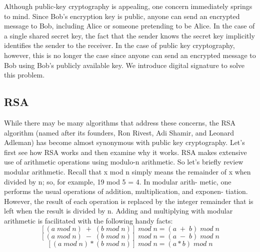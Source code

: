 \documentclass{report}
\theoremstyle{definition}
\begin{document}
{{\Large{Although public-key cryptography is appealing, one concern immediately
springs to mind. Since Bob’s encryption key is public, anyone can send an encrypted message to Bob, including Alice or someone pretending to be Alice. In the case of
a single shared secret key, the fact that the sender knows the secret key implicitly
identifies the sender to the receiver. In the case of public key cryptography, however,
this is no longer the case since anyone can send an encrypted message to Bob using
Bob’s publicly available key. We introduce digital signature to solve this problem.
\subsection{RSA}
\Large{While there may be many algorithms that address these concerns, the RSA algorithm
(named after its founders, Ron Rivest, Adi Shamir, and Leonard Adleman) has
become almost synonymous with public key cryptography. Let’s first see how RSA
works and then examine why it works.
RSA makes extensive use of arithmetic operations using modulo-n arithmetic.
So let’s briefly review modular arithmetic. Recall that x mod n simply means the
remainder of x when divided by n; so, for example, 19 mod 5 = 4. In modular arith-
metic, one performs the usual operations of addition, multiplication, and exponen-
tiation. However, the result of each operation is replaced by the integer remainder
that is left when the result is divided by n. Adding and multiplying with modular
arithmetic is facilitated with the following handy facts:}
$$[(a \;mod \;n) \;+\; (b \;mod\; n)] \;mod \;n = (a \;+\; b) \;mod\; n$$
$$[(a \;mod \;n) \;-\; (b\; mod \;n)]\; mod \;n = (a\; -\; b) \;mod \;n$$
$$[(a\; mod\; n) * (b\; mod\; n)] \;mod \;n = (a * b) \;mod \;n$$

}}}
\end{document}
